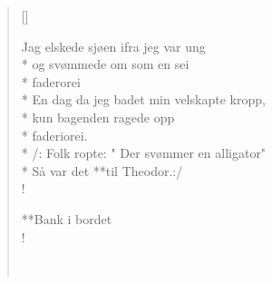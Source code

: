 \settowidth{\versewidth}{Lag elskede sjøen ifra jag var ung}



\begin{verse}[\versewidth]



Jag elskede sjøen ifra jeg var ung\\*
og svømmede om som en sei\\*
faderorei\\*
En dag da jeg badet min velskapte kropp,\\*
kun bagenden ragede opp\\*
faderiorei.\\*
/: Folk ropte: " Der svømmer en alligator"\\*
Så var det **til Theodor.:/\\!

\flagverse{}
**Bank i bordet\\!


\
\end{verse}

